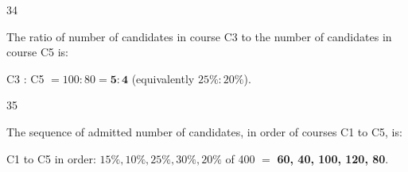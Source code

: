 \begin{question}{34}
{The ratio of number of candidates in course C3 to the number of candidates in course C5 is:\par}
\begin{explain}
C3 : C5 $=100:80=\mathbf{5:4}$ (equivalently $25\%:20\%$).
\end{explain}
\end{question}

\begin{question}{35}
{The sequence of admitted number of candidates, in order of courses C1 to C5, is:\par}
\begin{explain}
C1 to C5 in order: $15\%, 10\%, 25\%, 30\%, 20\%$ of 400 $=$ \textbf{60, 40, 100, 120, 80}.
\end{explain}
\end{question}

